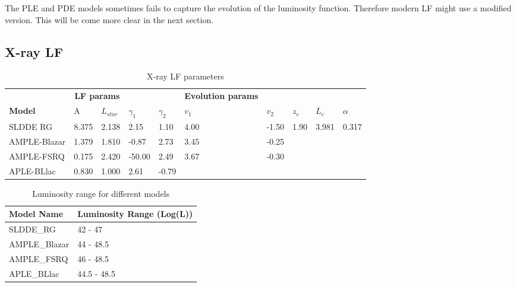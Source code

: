 \documentclass{article}
\begin{document}
The PLE and PDE models sometimes fails to capture the evolution of the luminosity function. Therefore modern 
LF might use a modified version. This will be come more clear in the next section.

\subsection{X-ray LF}

\begin{table}
\centering
\begin{tabularx}{\textwidth}{|l|XXXX|XXXXX|}
\hline

& \multicolumn{2}{c}{\textbf{LF params}} &&&  \textbf{Evolution params} &&&&\\

\textbf{Model} & A & $L_{star}$ & $\gamma _1$ &  $\gamma _2$  & $v_1$ & $v_2$ & $z_c$ & $L_c$ & $ \alpha$\\
\hline
SLDDE RG & 8.375 & 2.138 & 2.15 & 1.10 & 4.00 & -1.50 & 1.90 & 3.981 & 0.317  \\

AMPLE-Blazar & 1.379 & 1.810 & -0.87 & 2.73 & 3.45 & -0.25 & & &  \\

AMPLE-FSRQ & 0.175 & 2.420& -50.00 & 2.49 & 3.67 & -0.30 & & &  \\

APLE-BLlac & 0.830& 1.000 & 2.61 & -0.79 & & & & &  \\
\hline
\end{tabularx}
\caption{X-ray LF parameters}
\label{tab:xray_lf}
\end{table}

\begin{table}
    \centering
    \begin{tabular}{ll}
    \hline
     Model Name   & Luminosity Range (Log(L))  \\
    \hline
     SLDDE\_RG     & 42 - 47            \\
     AMPLE\_Blazar & 44 - 48.5          \\
     AMPLE\_FSRQ   & 46 - 48.5          \\
     APLE\_BLlac   & 44.5 - 48.5        \\
    \hline

\end{tabular}
\caption{Luminosity range for different models}
\label{tab:lum_range}

\end{table}
\end{document}
